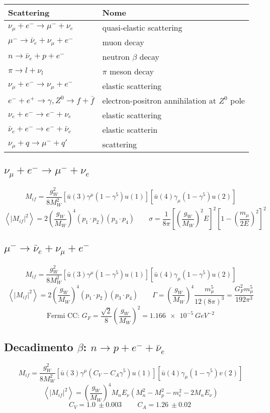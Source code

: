 \documentclass[10pt, onecolumn, a4paper]{article}
\def\({\left(}
\def\){\right)}
\def\[{\left[}
\def\]{\right]}
\def\<{\left<}
\def\>{\right>}
\begin{document}
\begin{center}
\begin{tabularx}{\textwidth}{X | l}
\toprule
Scattering & Nome \\
\midrule
$\nu_\mu+e^-\to \mu^-+\nu_e$ & quasi-elastic scattering \\
$\mu^-\to \bar\nu_e+\nu_\mu+e^-$ & muon decay \\
$n\to \bar\nu_e+p+e^-$ & neutron $\beta$ decay \\
$\pi\to l+\nu_l$ & $\pi$ meson decay \\
$\nu_\mu+e^-\to \nu_\mu+e^-$ & elastic scattering \\
$e^-+e^+\to \gamma,Z^0\to f+\bar f$ & electron-positron annihilation at $Z^0$ pole \\
$\nu_e+e^-\to e^-+\nu_e$ & elastic scattering \\
$\bar\nu_e+e^-\to e^-+\bar\nu_e$ & elastic scatterin \\
$\nu_\mu+q\to \mu^-+q'$ & scattering \\
\bottomrule
\end{tabularx}
\end{center}

\subsection{$\nu_\mu+e^-\to \mu^-+\nu_e$} %
$$M_{if}=\frac{g_W^2}{8M_W^2}\[\bar u\(3\)\gamma^{\mu}\(1-\gamma^5\)u\(1\)\]\[\bar u\(4\)\gamma_{\mu}\(1-\gamma^5\)u\(2\)\]$$
$$\<\left|M_{if}\right|^2\>=2\(\frac{g_W}{M_W}\)^4\(p_1\cdot p_2\)\(p_3\cdot p_4\) \qquad \sigma=\frac{1}{8\pi}\[\(\frac{g_W}{M_W}\)^2E\]^2\[1-\(\frac{m_{\mu}}{2E}\)^2\]^2$$

\subsection{$\mu^-\to \bar\nu_e+\nu_\mu+e^-$} %
$$M_{if}=\frac{g_W^2}{8M_W^2}\[\bar u\(3\)\gamma^{\mu}\(1-\gamma^5\)u\(1\)\]\[\bar u\(4\)\gamma_{\mu}\(1-\gamma^5\)u\(2\)\]$$
$$\<\left|M_{if}\right|^2\>=2\(\frac{g_W}{M_W}\)^4\(p_1\cdot p_2\)\(p_3\cdot p_4\) \qquad \Gamma=\(\frac{g_W}{M_W}\)^4\frac{m_{\mu}^5}{12\(8\pi\)^3}=\frac{G_F^2m_{\mu}^5}{192\pi^3}$$
$$\textrm{Fermi CC: } G_F=\frac{\sqrt{2}}{8}\(\frac{g_W}{M_W}\)^2=\SI{1.166e-5}{GeV^{-2}}$$

\subsection{Decadimento $\beta$: $n\to p+e^-+\bar\nu_e$} %
$$M_{if}=\frac{g_W^2}{8M_W^2}\[\bar u\(3\)\gamma^{\mu}\(C_V-C_A\gamma^5\)u\(1\)\]\[\bar u\(4\)\gamma_{\mu}\(1-\gamma^5\)v\(2\)\]$$
$$\<\left|M_{if}\right|^2\>=\(\frac{g_W}{M_W}\)^4M_nE_{\nu}\(M_n^2-M_p^2-m_e^2-2M_nE_{\nu}\)$$
$$C_V=\SI{1.0}{}\pm\SI{0.003}{} \qquad C_A=\SI{1.26}{}\pm\SI{0.02}{}$$
\end{document}

